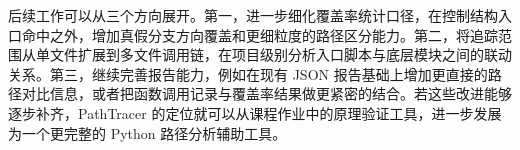 后续工作可以从三个方向展开。第一，进一步细化覆盖率统计口径，在控制结构入口命中之外，增加真假分支方向覆盖和更细粒度的路径区分能力。第二，将追踪范围从单文件扩展到多文件调用链，在项目级别分析入口脚本与底层模块之间的联动关系。第三，继续完善报告能力，例如在现有 JSON 报告基础上增加更直接的路径对比信息，或者把函数调用记录与覆盖率结果做更紧密的结合。若这些改进能够逐步补齐，PathTracer 的定位就可以从课程作业中的原理验证工具，进一步发展为一个更完整的 Python 路径分析辅助工具。
